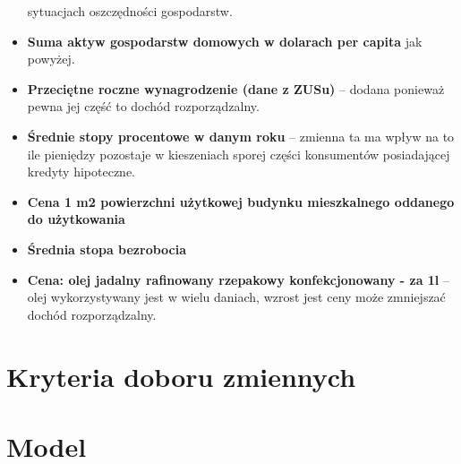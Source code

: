 \documentclass[a4paper,12pt,polish]{article}
\begin{document}
\begin{itemize}
    sytuacjach oszczędności gospodarstw.
    \item \textbf{Suma aktyw gospodarstw domowych w dolarach per capita} jak powyżej.
    \item \textbf{Przeciętne roczne wynagrodzenie (dane z ZUSu)} – dodana ponieważ 
    pewna jej część to dochód rozporządzalny. 
    \item \textbf{Średnie stopy procentowe w danym roku} – zmienna ta ma wpływ na to ile pieniędzy
    pozostaje w kieszeniach sporej części konsumentów posiadającej kredyty hipoteczne.
    \item \textbf{Cena 1 m2 powierzchni użytkowej budynku mieszkalnego oddanego do użytkowania}
    \item \textbf{Średnia stopa bezrobocia}
    \item \textbf{Cena: olej jadalny rafinowany rzepakowy konfekcjonowany - za 1l} – olej wykorzystywany
    jest w wielu daniach, wzrost jest ceny może zmniejszać dochód rozporządzalny.
\end{itemize}

\section{Kryteria doboru zmiennych}

\section{Model}

\subsection{}
\end{document}
